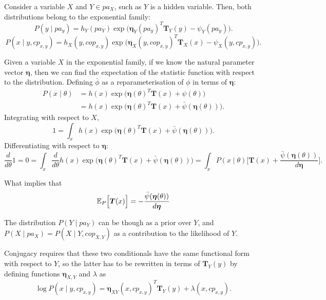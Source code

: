 Consider a variable \( X \) and \( Y \in pa_X \), such as \( Y \) is a hidden variable. Then, both distributions belong to the exponential family:
\[
     P(y \mid pa_y) = h_Y(pa_Y)\exp \Big( \bm{\eta}_Y(pa_y)^T\bm{T}_Y(y) - \psi_Y(pa_y) \Big).
\] 
\[
P(x \mid y,cp_{x,y}) = h_X(y, cop_{x,y})\exp \Big( \bm{\eta}_X(y, cop_{x,y})^T\bm{T}_X(x) - \psi_X(y, cp_{x,y}) \Big).
\]

\begin{remark}
  Given a variable \(X\) in the exponential family, if we know the natural parameter vector \(\bm{\eta}\), then we can find the expectation of the statistic function with respect to the distribution. Defining \(\bar{\phi}\) as a reparameterisation of \(\phi\) in terms of \(\bm{\eta}\):
  \[
    \begin{aligned}
      P(x\mid \theta) &= h(x)\exp \Big( \bm{\eta}(\theta)^{T}\bm{T}(x) + \psi(\theta) \Big)\\
       &= h(x)\exp \Big( \bm{\eta}(\theta)^{T}\bm{T}(x) + \bar{\psi}(\bm{\eta}(\theta)) \Big).
    \end{aligned}
  \]
  Integrating with respect to \(X\),
  \[
    1 = \int_{x} h(x)\exp \Big( \bm{\eta}(\theta)^{T}\bm{T}(x) + \bar{\psi}(\bm{\eta}(\theta)) \Big).
  \]
  Differentiating with respect to \(\bm{\eta}\):
  \[
    \frac{d}{d\theta}1 = 0 = \int_{x} \frac{d}{d\theta}h(x)\exp \Big( \bm{\eta}(\theta)^{T}\bm{T}(x) + \bar{\psi}(\bm{\eta}(\theta)) \Big) = \int_{x}P(x \mid \theta)\Big[ \bm{T}(x) + \frac{ \bar{\psi}(\bm{\eta}(\theta)) }{d \bm{\eta}}\Big].
  \]

  What implies that
  \[
    \mathbb{E}_{P}\Big[\bm{T}(x)\Big] =   -  \frac{ \bar{\psi}(\bm{\eta}(\theta)) }{d \bm{\eta}}
  \]

\end{remark}

The distribution \( P(Y \mid pa_Y) \) can be though as a prior over \( Y \), and \( P(X \mid pa_X) = P(X \mid Y, cop_{X,Y})\) as a contribution to the likelihood of \( Y \).

Conjugacy requires that these two conditionals have the same functional form with respect to \( Y \), so the latter has to be rewritten in terms of \( \bm{T}_Y (y)\) by defining functions \( \bm{\eta}_{X,Y} \) and \( \lambda \) as
\[
     \log P(x \mid y , cp_{x,y}) = \bm{\eta}_{XY}(x, cp_{x,y})^T \bm{T}_Y(y) + \lambda(x, cp_{x,y}).
\]

